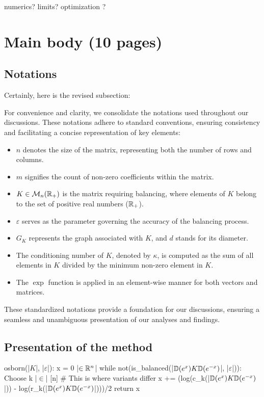 numerics?
limits? 
optimization ?

\section{Main body (10 pages)}

\subsection{Notations}

Certainly, here is the revised subsection:

For convenience and clarity, we consolidate the notations used throughout our discussions. These notations adhere to standard conventions, ensuring consistency and facilitating a concise representation of key elements:

\begin{itemize}
    \item \(n\) denotes the size of the matrix, representing both the number of rows and columns.
    \item \(m\) signifies the count of non-zero coefficients within the matrix.
    \item \(K \in \mathcal M_n(\mathbb{R}_+)\) is the matrix requiring balancing, where elements of \(K\) belong to the set of positive real numbers (\(\mathbb{R}_+\)).
    \item \(\varepsilon\) serves as the parameter governing the accuracy of the balancing process.
    \item \(G_K\) represents the graph associated with \(K\), and \(d\) stands for its diameter.
    \item The conditioning number of \(K\), denoted by \(\kappa\), is computed as the sum of all elements in \(K\) divided by the minimum non-zero element in \(K\).
    \item The \(\exp\) function is applied in an element-wise manner for both vectors and matrices.
\end{itemize}

These standardized notations provide a foundation for our discussions, ensuring a seamless and unambiguous presentation of our analyses and findings.

\subsection{Presentation of the method}


\begin{code}
osborn(|\(K\)|, |\(\varepsilon\)|):
    x = 0 |\(\in \mathbb{R}^n\)|
    while not(is_balanced(|\(\mathbb{D}(e^x) K \mathbb{D}(e^{-x})\)|, |\(\varepsilon\)|)):
        Choose k |\(\in\)| [n] # This is where variants differ
        x += (log(c_k(|\(\mathbb{D}(e^x) K \mathbb{D}(e^{-x})\)|)) - log(r_k(|\(\mathbb{D}(e^x) K \mathbb{D}(e^{-x})\)|)))/2
    return x
\end{code}

